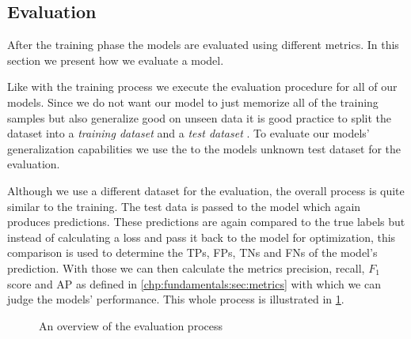\subsection{Evaluation}
\label{chp:study:sec:design:subsec:evaluation}
After the training phase the models are evaluated using different metrics.
In this section we present how we evaluate a model.

Like with the training process we execute the evaluation procedure for all of our models.
Since we do not want our model to just memorize all of the training samples but also generalize good on unseen data it is good practice to split the dataset into a \textit{training dataset} and a \textit{test dataset} \parencite{Reitermanova:2010}.
To evaluate our models' generalization capabilities we use the to the models unknown test dataset for the evaluation.

Although we use a different dataset for the evaluation, the overall process is quite similar to the training.
The test data is passed to the model which again produces predictions.
These predictions are again compared to the true labels but instead of calculating a loss and pass it back to the model for optimization, this comparison is used to determine the \acp{TP}, \acp{FP}, \acp{TN} and \acp{FN} of the model's prediction.
With those we can then calculate the metrics precision, recall, $F_1$ score and \ac{AP} as defined in \cref{chp:fundamentals:sec:metrics} with which we can judge the models' performance.
This whole process is illustrated in \cref{fig:study:design:evaluation}.

\newpage
\begin{figure}[htpb]
    \centering
    \def\svgwidth{\columnwidth}
    
    \caption[Study Design: Evaluation]{An overview of the evaluation process}\label{fig:study:design:evaluation}
\end{figure}
